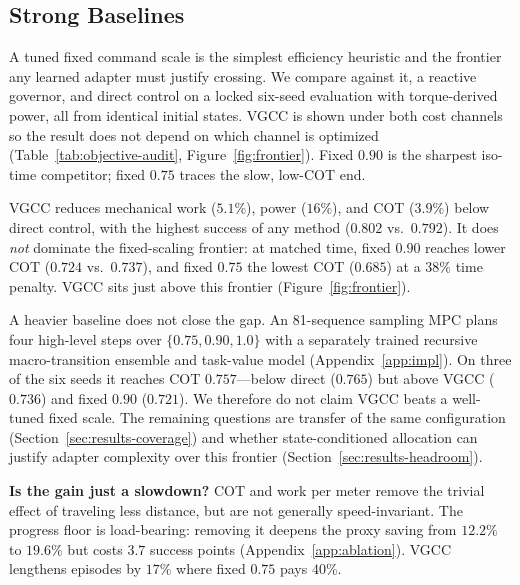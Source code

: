 \documentclass{article}
\begin{document}
\subsection{Strong Baselines}
\label{sec:results-baselines}

A tuned fixed command scale is the simplest efficiency heuristic and the
frontier any learned adapter must justify crossing. We compare against it, a
reactive governor, and direct control on a locked six-seed evaluation with
torque-derived power, all from identical initial states. VGCC is shown under both
cost channels so the result does not depend on which channel is optimized
(Table~\ref{tab:objective-audit}, Figure~\ref{fig:frontier}). Fixed $0.90$ is the
sharpest iso-time competitor; fixed $0.75$ traces the slow, low-COT end.

VGCC reduces mechanical work ($5.1\%$), power ($16\%$), and COT ($3.9\%$) below
direct control, with the highest success of any method ($0.802$ vs.\ $0.792$).
It does \emph{not} dominate the fixed-scaling frontier: at matched time, fixed
$0.90$ reaches lower COT ($0.724$ vs.\ $0.737$), and fixed $0.75$ the lowest COT
($0.685$) at a $38\%$ time penalty. VGCC sits just above this frontier
(Figure~\ref{fig:frontier}).

A heavier baseline does not close the gap. An 81-sequence sampling MPC plans four
high-level steps over $\{0.75,0.90,1.0\}$ with a separately trained recursive
macro-transition ensemble and task-value model (Appendix~\ref{app:impl}). On three
of the six seeds it reaches COT $0.757$---below direct ($0.765$) but above VGCC
($0.736$) and fixed $0.90$ ($0.721$). We therefore do not claim VGCC beats a well-tuned fixed scale. The remaining
questions are transfer of the same configuration
(Section~\ref{sec:results-coverage}) and whether state-conditioned allocation can
justify adapter complexity over this frontier
(Section~\ref{sec:results-headroom}).

\textbf{Is the gain just a slowdown?} COT and work per meter remove the trivial
effect of traveling less distance, but are not generally speed-invariant. The
progress floor is load-bearing: removing it deepens the proxy saving from $12.2\%$
to $19.6\%$ but costs $3.7$ success points (Appendix~\ref{app:ablation}). VGCC
lengthens episodes by $17\%$ where fixed $0.75$ pays $40\%$.
\end{document}
